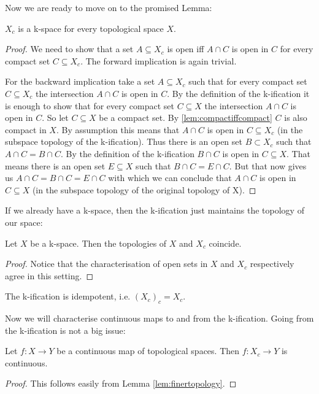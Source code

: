 Now we are ready to move on to the promised Lemma:

\begin{lem}\label{lem:kificationiskspace}
    $X_c$ is a k-space for every topological space $X$.
\end{lem}
\begin{proof}
    We need to show that a set $A \subseteq X_c$ is open iff $A \cap C$ is open in $C$ for every compact set $C \subseteq X_c$. 
    The forward implication is again trivial. 
    
    For the backward implication take a set $A \subseteq X_c$ such that for every compact set $C \subseteq X_c$ the intersection $A \cap C$ is open in $C$. 
    By the definition of the k-ification it is enough to show that for every compact set $C \subseteq X$ the intersection $A \cap C$ is open in $C$. So let $C \subseteq X$ be a compact set. 
    By \ref{lem:compactiffcompact} $C$ is also compact in $X$.
    By assumption this means that $A \cap C$ is open in $C \subseteq X_c$ (in the subspace topology of the k-ification). Thus there is an open set $B \subset X_c$ such that $A \cap C = B \cap C$. 
    By the definition of the k-ification $B \cap C$ is open in $C \subseteq X$. 
    That means there is an open set $E \subseteq X$ such that $B \cap C = E \cap C$. 
    But that now gives us $A \cap C = B \cap C = E \cap C$ with which we can conclude that $A \cap C$ is open in $C \subseteq X$ (in the subspace topology of the original topology of X).
\end{proof}

If we already have a k-space, then the k-ification just maintains the topology of our space:

\begin{lem}\label{lem:kificationkspace}
    Let $X$ be a k-space.
    Then the topologies of $X$ and $X_c$ coincide.
\end{lem}
\begin{proof}
    Notice that the characterisation of open sets in $X$ and $X_c$ respectively agree in this setting.
\end{proof}

\begin{cor}
    The k-ification is idempotent, i.e. $(X_c)_c = X_c$.
\end{cor}

Now we will characterise continuous maps to and from the k-ification. 
Going from the k-ification is not a big issue: 

\begin{lem}\label{lem:continuousfromkification}
    Let $f \colon X \to Y$ be a continuous map of topological spaces.
    Then $f \colon X_c \to Y$ is continuous.
\end{lem}
\begin{proof}
    This follows easily from Lemma \ref{lem:finertopology}.
\end{proof}

